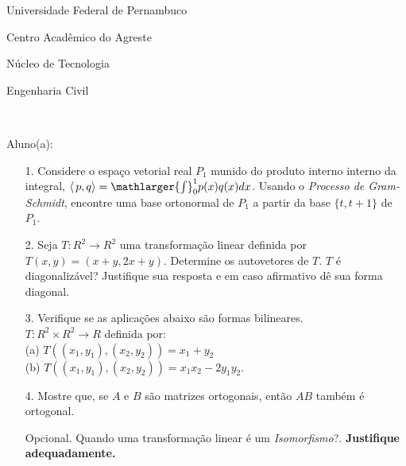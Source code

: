 \documentclass[oneside,a4paper,12pt]{article}
\newcommand{\universidade}{Universidade Federal de Pernambuco}
\newcommand{\centro}{Centro Acadêmico do Agreste}
\newcommand{\departamento}{Núcleo de Tecnologia}
\newcommand{\curso}{Engenharia Civil}
\begin{document}
	\pagestyle{empty}
	
	\begin{center}
	 	\vspace{0pt}
	 	
		\universidade
		\par
		\centro
		\par
		\departamento
		\par
		\curso
		\par
		\vspace{08pt}
		\\
	\end{center}
	
	
	\begin{flushleft}
		Aluno(a):
	\end{flushleft}
	
\begin{itemize}
\item[1.] Considere o espaço vetorial real $P_{1}$ munido do produto interno interno da integral, $\langle\,p,q\rangle=\mathlarger{\int}_{0}^{1}p(x)q(x)dx$. Usando o \textit{Processo de Gram-Schmidt}, encontre uma base ortonormal de $P_{1}$ a partir da base $\{t,t+1\}$ de $P_{1}$.
\end{itemize}
\begin{itemize}
\item[2.] Seja $T:R^{2}\longrightarrow R^{2}$ uma transformação linear definida por $T(x,y)=(x+y,2x+y)$. Determine os autovetores de $T$. $T$ é diagonalizável? Justifique sua resposta e em caso afirmativo dê sua forma diagonal. 
 \end{itemize}
 \begin{itemize}
\item [3.] Verifique se as aplicações abaixo são formas bilineares.\\
$T:R^{2}\times R^{2}\longrightarrow R$ definida por:\\ (a) $T((x_{1},y_{1}),(x_{2},y_{2}))=x_{1}+y_{2}$ \\
(b) $T((x_{1},y_{1}),(x_{2},y_{2}))=x_{1}x_{2}-2y_{1}y_{2}$.
\end{itemize}
\begin{itemize}
\item[4.] Mostre que, se $A$ e $B$ são matrizes ortogonais, então $AB$ também é ortogonal.
\end{itemize}
\begin{itemize}
	\item[Opcional.] Quando uma transformação linear é um \textit{Isomorfismo}?. \textbf{Justifique adequadamente.}
	
\end{itemize}
  \vspace{12pt}
  
\end{document}
